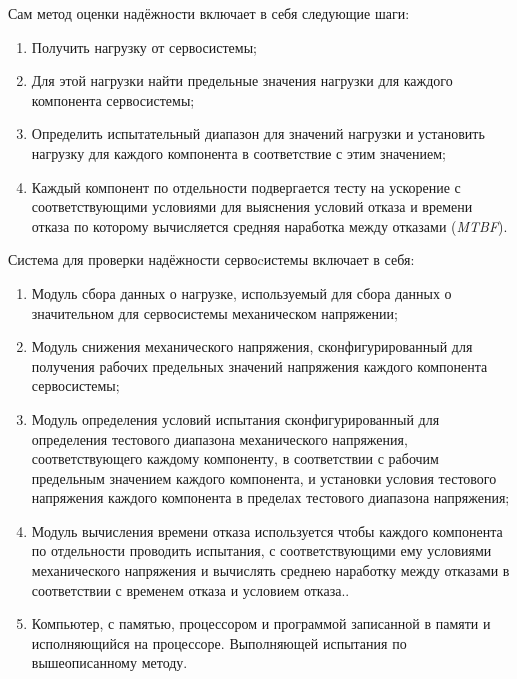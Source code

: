 Сам метод оценки надёжности включает в себя следующие шаги:
\begin{enumerate}
\item Получить нагрузку от сервосистемы;
  
\item Для этой нагрузки найти предельные значения нагрузки для каждого
  компонента сервосистемы;
  
\item Определить испытательный диапазон для значений нагрузки и
  установить нагрузку для каждого компонента в соответствие с этим
  значением;
  
\item Каждый компонент по отдельности подвергается тесту на ускорение с
  соответствующими условиями для выяснения условий отказа и времени
  отказа по которому вычисляется средняя наработка между отказами (\textit{MTBF}).  
\end{enumerate}

Система для проверки надёжности сервоcистемы включает в себя:
\begin{enumerate}
\item Модуль сбора данных о нагрузке, используемый для сбора данных о
  значительном для сервосистемы механическом напряжении;
  
\item Модуль снижения механического напряжения, сконфигурированный для
  получения рабочих предельных значений напряжения каждого компонента
  сервосистемы;
  
\item Модуль определения условий испытания сконфигурированный для
  определения тестового диапазона механического напряжения,
  соответствующего каждому компоненту, в соответствии с рабочим
  предельным значением каждого компонента, и
  установки условия тестового напряжения каждого компонента в пределах
  тестового диапазона напряжения;
  
\item Модуль вычисления времени отказа используется
  чтобы каждого компонента по отдельности проводить испытания,
  с соответствующими ему условиями механического напряжения и вычислять
  среднею наработку между отказами в соответствии с временем отказа и
  условием отказа..
  
\item Компьютер, с памятью, процессором и программой записанной в
  памяти и исполняющийся на процессоре. Выполняющей испытания по
  вышеописанному методу.
  
\end{enumerate}

